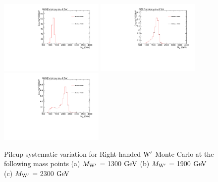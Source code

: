 \begin{figure}[htcb]
\begin{center}
\includegraphics[width=0.45\textwidth]{AN-13-004/figs/Signal_M1300_PileupReweighting}
\includegraphics[width=0.45\textwidth]{AN-13-004/figs/Signal_M1900_PileupReweighting}
\includegraphics[width=0.45\textwidth]{AN-13-004/figs/Signal_M2300_PileupReweighting}
\caption{
Pileup systematic variation for Right-handed $\mathrm{W}^\prime$ Monte Carlo at the following mass points
(a) $M_{\mathrm{W}^\prime}$ = 1300$~\mathrm{GeV}$ 
(b) $M_{\mathrm{W}^\prime}$ = 1900$~\mathrm{GeV}$
(c) $M_{\mathrm{W}^\prime}$ = 2300$~\mathrm{GeV}$ 
}
\label{figs:signalPU}
\end{center}
\end{figure}


